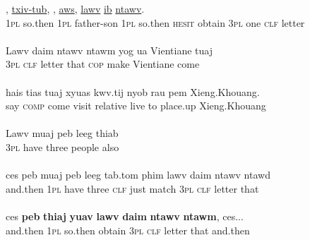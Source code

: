 \documentclass[output=paper]{LSP/langsci}
\begin{document}
\begin{exe}
\ex \label{Jaex:19af}
\begin{xlist}
\ex \label{Jaex:19a}
\gll \underline{} \underline{}, \underline{} \underline{txiv-tub}, \underline{} \underline{},     \underline{aws}, \underline{} \underline{lawv} \underline{ib}     \underline{}  \underline{ntawv}.\\
1\textsc{pl} so.then 1\textsc{pl} father-son 1\textsc{pl} so.then \textsc{hesit} obtain 3\textsc{pl} one \textsc{clf} letter\\
\glt {}\\
\ex \label{Jaex:19b}
\gll Lawv daim ntawv ntawm yog ua Vientiane tuaj\\
 3\textsc{pl} \textsc{clf} letter that \textsc{cop} make  Vientiane come\\ 
\glt {}\\
\ex \label{Jaex:19c}
\gll hais tias tuaj xyuas  kwv.tij nyob rau pem Xieng.Khouang.\\		
say \textsc{comp} come visit  relative live to place.up Xieng.Khouang\\ 
\glt {}\\
\ex \label{Jaex:19d}
\gll Lawv muaj peb  leeg  thiab\\
     3\textsc{pl} have three people also \\ 
\glt {}\\
\ex \label{Jaex:19e}
\gll ces peb muaj peb leeg tab.tom phim  lawv daim ntawv ntawd\\
     and.then 1\textsc{pl} have three \textsc{clf} just  match 3\textsc{pl} \textsc{clf} letter  that\\ 
\glt {}\\
\ex \label{Jaex:19f}
\gll ces \textbf{peb} \textbf{thiaj}  \textbf{yuav} \textbf{lawv} \textbf{daim} \textbf{ntawv} \textbf{ntawm}, ces...\\		           
 and.then  1\textsc{pl} so.then obtain 3\textsc{pl} \textsc{clf} letter  that  and.then\\
\glt {} \citep[][227]{fuller85}
\end{xlist}
\end{exe}
\end{document}
